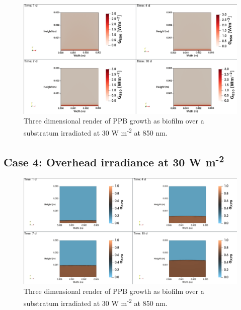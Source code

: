 \begin{figure}[H]
    \centering
    \includegraphics[width=\textwidth,height=0.4\textheight]{Chap4/results/post_processing/2D_cases/case3_rad.png}
    \caption{Three dimensional render of PPB growth as biofilm over a substratum irradiated at 30 W m\textsuperscript{-2} at 850 nm. } 
    \label{fig:case5_3D_rad}
\end{figure}

\subsection{Case 4: Overhead irradiance at 30 W m\textsuperscript{-2}}
\begin{figure}[H]
    \centering
    \includegraphics[width=\textwidth,height=0.4\textheight]{Chap4/results/post_processing/2D_cases/case4_ppb.png}
    \caption{Three dimensional render of PPB growth as biofilm over a substratum irradiated at 30 W m\textsuperscript{-2} at 850 nm. } 
    \label{fig:case5_3D_rad}
\end{figure}


